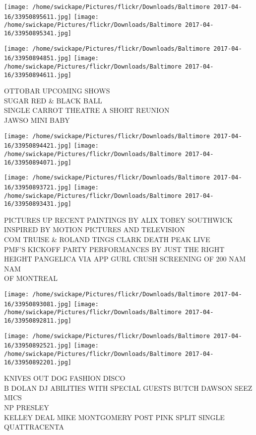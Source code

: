 \documentclass[10pt,letterpaper]{article}
\begin{document}
\texttt{[image: /home/swickape/Pictures/flickr/Downloads/Baltimore 2017-04-16/33950895611.jpg]}
\texttt{[image: /home/swickape/Pictures/flickr/Downloads/Baltimore 2017-04-16/33950895341.jpg]}

\texttt{[image: /home/swickape/Pictures/flickr/Downloads/Baltimore 2017-04-16/33950894851.jpg]}
\texttt{[image: /home/swickape/Pictures/flickr/Downloads/Baltimore 2017-04-16/33950894611.jpg]}

OTTOBAR UPCOMING SHOWS\\
SUGAR RED \& BLACK BALL\\
SINGLE CARROT THEATRE A SHORT REUNION\\
JAWSO MINI BABY\\
\pagebreak

\texttt{[image: /home/swickape/Pictures/flickr/Downloads/Baltimore 2017-04-16/33950894421.jpg]}
\texttt{[image: /home/swickape/Pictures/flickr/Downloads/Baltimore 2017-04-16/33950894071.jpg]}

\texttt{[image: /home/swickape/Pictures/flickr/Downloads/Baltimore 2017-04-16/33950893721.jpg]}
\texttt{[image: /home/swickape/Pictures/flickr/Downloads/Baltimore 2017-04-16/33950893431.jpg]}

PICTURES UP RECENT PAINTINGS BY ALIX TOBEY SOUTHWICK INSPIRED BY MOTION PICTURES AND TELEVISION\\
COM TRUISE \& ROLAND TINGS CLARK DEATH PEAK LIVE\\
PMF'S KICKOFF PARTY PERFORMANCES BY JUST THE RIGHT HEIGHT PANGELICA VIA APP GURL CRUSH SCREENING OF 200 NAM NAM\\
OF MONTREAL\\
\pagebreak

\texttt{[image: /home/swickape/Pictures/flickr/Downloads/Baltimore 2017-04-16/33950893081.jpg]}
\texttt{[image: /home/swickape/Pictures/flickr/Downloads/Baltimore 2017-04-16/33950892811.jpg]}

\texttt{[image: /home/swickape/Pictures/flickr/Downloads/Baltimore 2017-04-16/33950892521.jpg]}
\texttt{[image: /home/swickape/Pictures/flickr/Downloads/Baltimore 2017-04-16/33950892201.jpg]}

KNIVES OUT DOG FASHION DISCO\\
B DOLAN DJ ABILITIES WITH SPECIAL GUESTS BUTCH DAWSON SEEZ MICS\\
NP PRESLEY\\
KELLEY DEAL MIKE MONTGOMERY POST PINK SPLIT SINGLE QUATTRACENTA\\
\pagebreak
\end{document}
